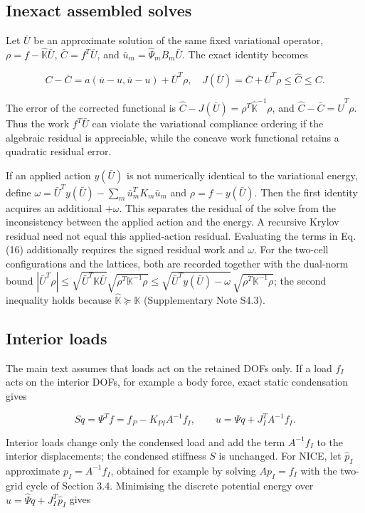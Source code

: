 \documentclass[preprint,12pt,authoryear]{elsarticle}
\begin{document}
\subsection{Inexact assembled solves}

Let \(\bar U\) be an approximate solution of the same fixed variational operator, \(\rho=f-\widehat{\mathbb K}\bar U\), \(\bar C=f^T\bar U\), and \(\bar u_m=\widehat\Psi_mB_m\bar U\). The exact identity becomes

\[
\boxed{C-\bar C
=a(\bar u-u,\bar u-u)+\bar U^T\rho,
\quad
J(\bar U)=\bar C+\bar U^T\rho\le\widehat C\le C.}
\]

The error of the corrected functional is \(\widehat C-J(\bar U)=\rho^T\widehat{\mathbb K}^{-1}\rho\), and \(\widehat C-\bar C=\widehat U^T\rho\). Thus the work \(f^T\bar U\) can violate the variational compliance ordering if the algebraic residual is appreciable, while the concave work functional retains a quadratic residual error.

If an applied action \(y(\bar U)\) is not numerically identical to the variational energy, define
\(\omega=\bar U^Ty(\bar U)-\sum_m\bar u_m^TK_m\bar u_m\)
and \(\rho=f-y(\bar U)\). Then the first identity acquires an additional \(+\omega\). This separates the residual of the solve from the inconsistency between the applied action and the energy. A recursive Krylov residual need not equal this applied-action residual. Evaluating the terms in Eq. (16) additionally requires the signed residual work and \(\omega\). For the two-cell configurations and the lattices, both are recorded together with the dual-norm bound \(|\bar U^T\rho|\le\sqrt{\bar U^T\mathbb K\bar U}\sqrt{\rho^T\mathbb K^{-1}\rho}\le\sqrt{\bar U^Ty(\bar U)-\omega}\,\sqrt{\rho^T\mathbb K^{-1}\rho}\); the second inequality holds because \(\widehat{\mathbb K}\succeq\mathbb K\) (Supplementary Note S4.3).

\subsection{Interior loads}

The main text assumes that loads act on the retained DOFs only. If a load \(f_I\) acts on the interior DOFs, for example a body force, exact static condensation gives

\[
Sq=\Psi^Tf=f_P-K_{PI}A^{-1}f_I,\qquad u=\Psi q+J_I^TA^{-1}f_I .
\]

Interior loads change only the condensed load and add the term \(A^{-1}f_I\) to the interior displacements; the condensed stiffness \(S\) is unchanged. For NICE, let \(\widehat p_I\) approximate \(p_I=A^{-1}f_I\), obtained for example by solving \(Ap_I=f_I\) with the two-grid cycle of Section 3.4. Minimising the discrete potential energy over \(\widehat u=\widehat\Psi q+J_I^T\widehat p_I\) gives
\end{document}
